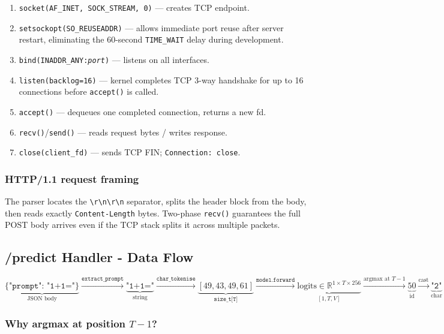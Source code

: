 \documentclass[12pt, a4paper]{article}
\begin{document}
\begin{enumerate}
  \item \texttt{socket(AF\_INET, SOCK\_STREAM, 0)} --- creates TCP endpoint.
  \item \texttt{setsockopt(SO\_REUSEADDR)} --- allows immediate port reuse after
        server restart, eliminating the 60-second \texttt{TIME\_WAIT} delay during
        development.
  \item \texttt{bind(INADDR\_ANY:\textit{port})} --- listens on all interfaces.
  \item \texttt{listen(backlog=16)} --- kernel completes TCP 3-way handshake for
        up to 16 connections before \texttt{accept()} is called.
  \item \texttt{accept()} --- dequeues one completed connection, returns a new fd.
  \item \texttt{recv()}/\texttt{send()} --- reads request bytes / writes response.
  \item \texttt{close(client\_fd)} --- sends TCP FIN; \texttt{Connection: close}.
\end{enumerate}

\subsubsection{HTTP/1.1 request framing}

The parser locates the \texttt{\textbackslash r\textbackslash n\textbackslash r\textbackslash n} separator, splits the
header block from the body, then reads exactly \texttt{Content-Length} bytes.
Two-phase \texttt{recv()} guarantees the full POST body arrives even if the TCP
stack splits it across multiple packets.

\subsection{/predict Handler - Data Flow}

\[
\underbrace{\texttt{\{"prompt": "1+1="\}}}_{\text{JSON body}}
\xrightarrow{\texttt{extract\_prompt}}
\underbrace{\texttt{"1+1="}}_{\text{string}}
\xrightarrow{\texttt{char\_tokenise}}
\underbrace{[49,43,49,61]}_{\texttt{size\_t[T]}}
\xrightarrow{\texttt{model.forward}}
\underbrace{\text{logits} \in \mathbb{R}^{1 \times T \times 256}}_{[1,T,V]}
\xrightarrow{\text{argmax at }T-1}
\underbrace{50}_{\text{id}}
\xrightarrow{\text{cast}}
\underbrace{\texttt{"2"}}_{\text{char}}
\]

\subsubsection{Why argmax at position $T-1$?}
\end{document}
